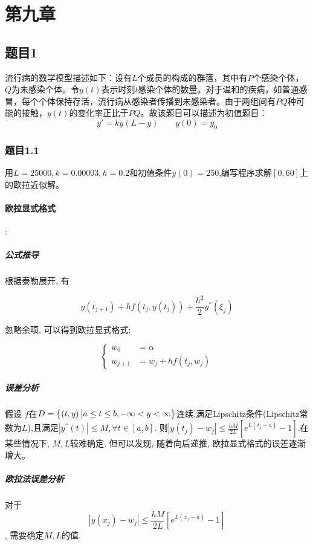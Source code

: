 \section{第九章}

\subsection{题目1}

流行病的数学模型描述如下：设有$L$个成员的构成的群落，其中有$P$个感染个体，$Q$为未感染个体。令$y(t)$表示时刻$t$感染个体的数量。对于温和的疾病，如普通感冒，每个个体保持存活，流行病从感染者传播到未感染者。由于两组间有$PQ$种可能的接触，$y(t)$的变化率正比于$PQ$。故该题目可以描述为初值题目：
$$y'=ky(L-y)\qquad y(0)=y_0$$

\subsubsection{题目1.1}

用$L=25000,k=0.00003,h=0.2$和初值条件$y(0)=250$,编写程序求解$[0,60]$上的欧拉近似解。

\paragraph{欧拉显式格式}:
\subparagraph{公式推导}
根据泰勒展开, 有

$$y\left(t_{j+1}\right) + hf\left(t_j,y\left(t_j\right)\right) + \frac{h^2}{2}y^{''}\left(\xi_j\right)$$

忽略余项, 可以得到欧拉显式格式:

$$\left\{
\begin{aligned}
w_0 &= \alpha \\
w_{j+1} &= w_j + hf\left(t_j,w_j\right)
\end{aligned}
\right.$$

\subparagraph{误差分析}

假设 $f$在$D = \left\{\left(t,y\right) \big{|} a \leq t \leq b,-\infty < y < \infty \right\}$连续,满足Lipschitz条件(Lipschitz常数为$L$),且满足$\left|y^{''}\left(t\right) \right| \leq M,\forall t\in \left[a,b\right]$. 则$\left|y\left(t_j\right) - w_j \right| \leq \frac{hM}{2L}\left[ e^{L\left(t_j-a\right)}-1\right]$.在某些情况下, $M,L$较难确定. 但可以发现, 随着向后递推, 欧拉显式格式的误差逐渐增大。

\subparagraph{欧拉法误差分析}

对于$$\left|y\left(x_j\right) - w_j \right| \leq \frac{hM}{2L}\left[ e^{L\left(x_j-a\right)}-1\right]$$, 需要确定$M,L$的值.

